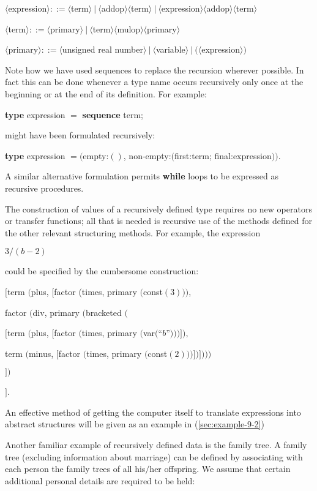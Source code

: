 	\quad $\langle$expression$\rangle ::= \langle$term$\rangle\ |\ \langle$addop$\rangle \langle$term$\rangle\ |\ \langle$expression$\rangle \langle$addop$\rangle \langle$term$\rangle$

	\quad $\langle$term$\rangle ::= \langle$primary$\rangle\ |\ \langle$term$\rangle\langle$mulop$\rangle\langle$primary$\rangle$
	
	\quad $\langle$primary$\rangle ::= \langle$unsigned real number$\rangle\ |\ \langle$variable$\rangle\ |\ (\langle$expression$\rangle)$

Note how we have used sequences to replace the recursion wherever possible. In fact this can be done whenever a type name occurs recursively only once at the beginning or at the end of its definition. For example:

\quad \textbf{type} expression $=$ \textbf{sequence} term;

\noindent
might have been formulated recursively:

\quad \textbf{type} expression $= ($empty:$()$, non-empty:$($first:term; final:expression$))$.

\noindent
A similar alternative formulation permits \textbf{while} loops to be expressed as recursive procedures.

The construction of values of a recursively defined type requires no new operators or transfer functions; all that is needed is recursive use of the methods defined for the other relevant structuring methods. For example, the expression

\quad $3/(b - 2)$

\noindent
could be specified by the cumbersome construction:

\quad $[$term $($plus, $[$factor (times, primary $($const$(3)))$,

\tabto*{7.75em} factor $($div, primary $($bracketed $($

\tabto*{9em}  $[$term $($plus, $[$factor $($times, primary $($var$($``$b$''$)))]),$

\tabto*{9.1em}  term $($minus, $[$factor $($times, primary $($const$(2)))])])))$

\tabto*{7.55em}  $])$

\quad $]$.

\noindent
An effective method of getting the computer itself to translate expressions into abstract structures will be given as an example in (\ref{sec:example-9-2})

Another familiar example of recursively defined data is the family tree. A family tree (excluding information about marriage) can be defined by associating with each person the family trees of all his$/$her offspring. We assume that certain additional personal details are required to be held: 

